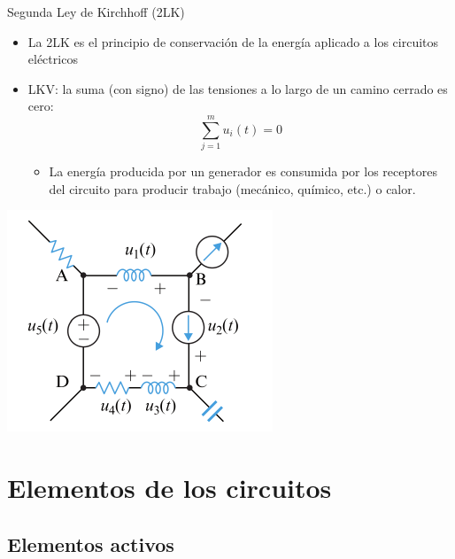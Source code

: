 \documentclass[aspectratio=169, xcolor={usenames,svgnames,dvipsnames}]{beamer}
\begin{document}
\begin{frame}{Segunda Ley de Kirchhoff (2LK)}
\begin{itemize}
\item La \alert{2LK} es el principio de conservación de la energía aplicado a los circuitos eléctricos

\item \alert{LKV}: la suma (con signo) de las tensiones a lo largo de un camino cerrado es cero:
\begin{equation*}
			\boxed{\sum_{j=1}^m u_i(t)=0}
		\end{equation*}

\begin{itemize}
\item La energía producida por un generador es consumida por los receptores del circuito para producir trabajo (mecánico, químico, etc.) o calor.
\end{itemize}
\end{itemize}

\begin{center}
\includegraphics[height=0.35\textheight]{../figs/LKV_FM.pdf}
\end{center}
\end{frame}

\section{Elementos de los circuitos}

\subsection{Elementos activos}
\label{sec:org2b18ef6}
\end{document}
